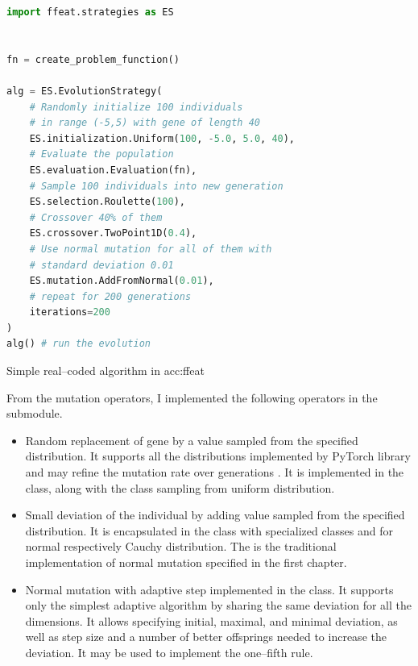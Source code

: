 \begin{algorithm}[b!]
\begin{lstlisting}[language=Python, xrightmargin=18pt]
import ffeat.strategies as ES


fn = create_problem_function()

alg = ES.EvolutionStrategy(
    # Randomly initialize 100 individuals 
    # in range (-5,5) with gene of length 40
    ES.initialization.Uniform(100, -5.0, 5.0, 40),
    # Evaluate the population
    ES.evaluation.Evaluation(fn),
    # Sample 100 individuals into new generation
    ES.selection.Roulette(100),
    # Crossover 40% of them
    ES.crossover.TwoPoint1D(0.4),
    # Use normal mutation for all of them with 
    # standard deviation 0.01
    ES.mutation.AddFromNormal(0.01),
    # repeat for 200 generations
    iterations=200
)
alg() # run the evolution
\end{lstlisting}
\caption{Simple real--coded algorithm in \acrshort*{acc:ffeat}}
\label{alg:esffeat}
\end{algorithm}

From the mutation operators, I implemented the following operators in the  submodule.
\begin{itemize}
    \item Random replacement of gene by a value sampled from the specified distribution. It supports all the distributions implemented by PyTorch library and may refine the mutation rate over generations \citep{PyTorchDoc}. It is implemented in the  class, along with the  class sampling from uniform distribution.
    \item Small deviation of the individual by adding value sampled from the specified distribution. It is encapsulated in the  class with specialized classes  and  for normal respectively Cauchy distribution. The  is the traditional implementation of normal mutation specified in the first chapter.
    \item Normal mutation with adaptive step implemented in the  class. It supports only the simplest adaptive algorithm by sharing the same deviation for all the dimensions. It allows specifying initial, maximal, and minimal deviation, as well as step size and a number of better offsprings needed to increase the deviation. It may be used to implement the one--fifth rule.
\end{itemize}

